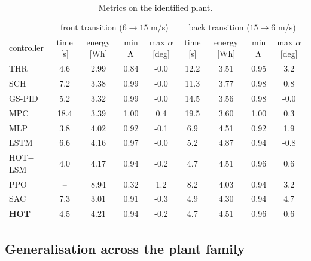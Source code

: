 \documentclass[final,5p,times,twocolumn]{elsarticle}
\begin{document}
\begin{table}[t]\centering\footnotesize
\caption{Metrics on the identified plant.}\label{tab:nominal}

\begin{tabular}{l|cccc|cccc}\toprule
& \multicolumn{4}{c|}{front transition ($6\to15$ m/s)} & \multicolumn{4}{c}{back transition ($15\to6$ m/s)}\\
controller & time [s] & energy [Wh] & min $\Lambda$ & max $\alpha$ [deg] & time [s] & energy [Wh] & min $\Lambda$ & max $\alpha$ [deg]\\\midrule
THR & 4.6 & 2.99 & 0.84 & -0.0 & 12.2 & 3.51 & 0.95 & 3.2\\
SCH & 7.2 & 3.38 & 0.99 & -0.0 & 11.3 & 3.77 & 0.98 & 0.8\\
GS-PID & 5.2 & 3.32 & 0.99 & -0.0 & 14.5 & 3.56 & 0.98 & -0.0\\
MPC & 18.4 & 3.39 & 1.00 & 0.4 & 19.5 & 3.60 & 1.00 & 0.3\\
MLP & 3.8 & 4.02 & 0.92 & -0.1 & 6.9 & 4.51 & 0.92 & 1.9\\
LSTM & 6.6 & 4.16 & 0.97 & -0.0 & 5.2 & 4.87 & 0.94 & -0.8\\
HOT$-$LSM & 4.0 & 4.17 & 0.94 & -0.2 & 4.7 & 4.51 & 0.96 & 0.6\\
PPO & -- & 8.94 & 0.32 & 1.2 & 8.2 & 4.03 & 0.94 & 3.2\\
SAC & 7.3 & 3.01 & 0.91 & -0.3 & 4.9 & 4.30 & 0.94 & 4.7\\
\textbf{HOT} & 4.5 & 4.21 & 0.94 & -0.2 & 4.7 & 4.51 & 0.96 & 0.6\\
\bottomrule\end{tabular}

\end{table}


\subsection{Generalisation across the plant family}\label{sec:cross}
\end{document}
